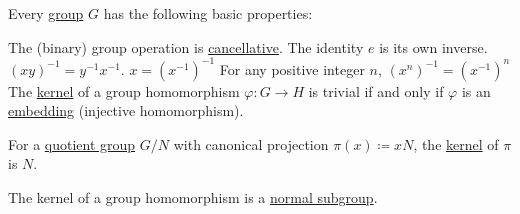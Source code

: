 \begin{proposition}\label{thm:def:group/properties}
  Every \hyperref[def:group]{group} \( G \) has the following basic properties:
  \begin{thmenum}
     The (binary) group operation is \hyperref[def:magma/cancellative]{cancellative}.
     The identity \( e \) is its own inverse.
     \( (xy)^{-1} = y^{-1} x^{-1} \).
     \( x = (x^{-1})^{-1} \)
     For any positive integer \( n \), \( (x^n)^{-1} = (x^{-1})^n \)
     The \hyperref[def:group/kernel]{kernel} of a group homomorphism \( \varphi: G \to H \) is trivial if and only if \( \varphi \) is an \hyperref[def:first_order_homomorphism_invertibility/embedding]{embedding} (injective homomorphism).

     For a \hyperref[def:group/quotient]{quotient group} \( G / N \) with canonical projection \( \pi(x) \coloneqq xN \), the \hyperref[def:group/kernel]{kernel} of \( \pi \) is \( N \).

     The kernel of a group homomorphism is a \hyperref[thm:normal_subgroup]{normal subgroup}.
  \end{thmenum}
\end{proposition}

